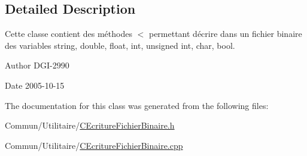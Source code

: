 \subsection{Detailed Description}
Cette classe contient des méthodes $<$ permettant d\textquotesingle{}écrire dans un fichier binaire des variables string, double, float, int, unsigned int, char, bool. 

\begin{DoxyAuthor}{Author}
D\+G\+I-\/2990 
\end{DoxyAuthor}
\begin{DoxyDate}{Date}
2005-\/10-\/15 
\end{DoxyDate}


The documentation for this class was generated from the following files\+:\begin{DoxyCompactItemize}
\item 
Commun/\+Utilitaire/\hyperlink{_c_ecriture_fichier_binaire_8h}{C\+Ecriture\+Fichier\+Binaire.\+h}\item 
Commun/\+Utilitaire/\hyperlink{_c_ecriture_fichier_binaire_8cpp}{C\+Ecriture\+Fichier\+Binaire.\+cpp}\end{DoxyCompactItemize}
